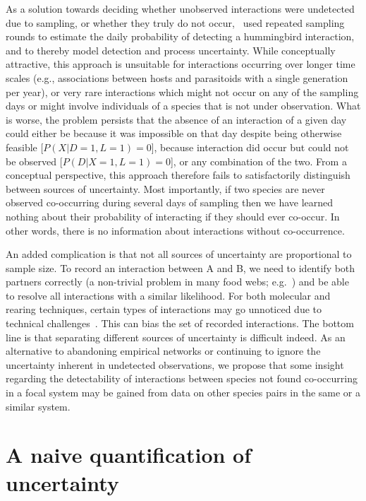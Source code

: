 \documentclass[12pt]{article}
\begin{document}
\begin{spacing}{2.0}
    As a solution towards deciding whether unobserved interactions were undetected due to sampling, or whether they truly do not occur,~\citet{Weinstein2017} used repeated sampling rounds to estimate the daily probability of detecting a hummingbird interaction, and to thereby model detection and process uncertainty. While conceptually attractive, this approach is unsuitable for interactions occurring over longer time scales (e.g., associations between hosts and parasitoids with a single generation per year), or very rare interactions which might not occur on any of the sampling days or might involve individuals of a species that is not under observation. What is worse, the problem persists that the absence of an interaction of a given day could  either be because it was impossible on that day despite being otherwise feasible [$P(X|D=1,L=1)=0$], because interaction did occur but could not be observed [$P(D|X=1,L=1)=0$], or any combination of the two. From a conceptual perspective, this approach therefore fails to satisfactorily distinguish between sources of uncertainty. Most importantly, if two species are never observed co-occurring during several days of sampling then we have learned nothing about their probability of interacting if they should ever co-occur. In other words, there is no information about interactions without co-occurrence.


    An added complication is that not all sources of uncertainty are proportional to sample size. To record an interaction between A and B, we need to identify both partners correctly (a non-trivial problem in many food webs; e.g.~\citealp{Kaartinen2011,Roslin2016}) and be able to resolve all interactions with a similar likelihood. For both molecular and rearing techniques, certain types of interactions may go unnoticed due to technical challenges~\citep{Wirta2014}. This can bias the set of recorded interactions. The bottom line is that separating different sources of uncertainty is difficult indeed. As an alternative to abandoning empirical networks or continuing to ignore the uncertainty inherent in undetected observations, we propose that some insight regarding the detectability of interactions between species not found co-occurring in a focal system may be gained from data on other species pairs in the same or a similar system. 


\section*{A naive quantification of uncertainty}


\end{spacing}
\end{document}
